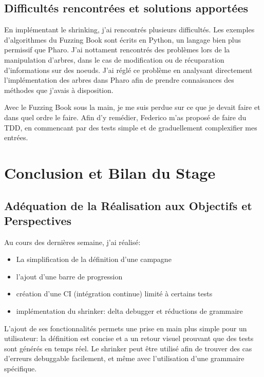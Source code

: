 \documentclass[11pt,a4paper]{report}
\begin{document}
\section{Difficultés rencontrées et solutions apportées}
En implémentant le shrinking, j'ai rencontrés plusieurs difficultés.  
Les exemples d'algorithmes du Fuzzing Book sont écrits en Python, un langage
bien plus permissif que Pharo. J'ai nottament rencontrés des problèmes lors de la 
manipulation d'arbres, dans le cas de modification ou de récuparation 
d'informations sur des noeuds. J'ai réglé ce problème en analysant directement
l'implémentation des arbres dans Pharo afin de prendre connaisances
des méthodes que j'avais à disposition. 

Avec le Fuzzing Book sous la main, je me suis perdue sur ce que je 
devait faire et dans quel ordre le faire. Afin d'y remédier, Federico m'as proposé
de faire du TDD, en commencant par des tests simple et de graduellement complexifier 
mes entrées. 


\chapter{Conclusion et Bilan du Stage}
\label{ch:conclusion}

\section{Adéquation de la Réalisation aux Objectifs et Perspectives}
Au cours des dernières semaine, j'ai réalisé: 
\begin{itemize}
    \item La simplification de la définition d'une campagne
    \item l'ajout d'une barre de progression
    \item création d'une CI (intégration continue) limité à certains tests
    \item implémentation du shrinker: delta debugger et réductions de grammaire 
\end{itemize}

L'ajout de ses fonctionnalités permets une prise en main plus simple pour 
un utilisateur: la définition est concise et a un retour visuel prouvant
que des tests sont générés en temps réel. Le shrinker peut être utilisé afin de 
trouver des cas d'erreurs debuggable facilement, et même avec
l'utilisation d'une grammaire spécifique. 
\end{document}
